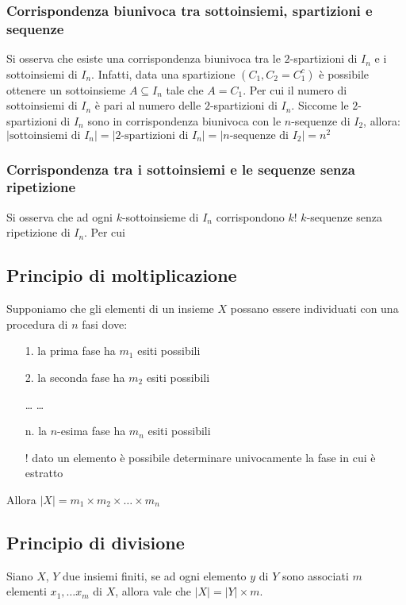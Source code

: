 \documentclass[a4paper]{article}
\begin{document}
\subsubsection*{Corrispondenza biunivoca tra sottoinsiemi, spartizioni e sequenze}
Si osserva che esiste una corrispondenza biunivoca tra le \(2\)-spartizioni di \(I_n\) e i sottoinsiemi di \(I_n\). Infatti, data
una spartizione \((C_1,C_2 = C_1^c)\) è possibile ottenere un sottoinsieme \(A \subseteq I_n\) tale che \(A = C_1\). Per cui il numero
di sottoinsiemi di \(I_n\) è pari al numero delle \(2\)-spartizioni di \(I_n\). Siccome le \(2\)-spartizioni di \(I_n\) sono in 
corrispondenza biunivoca con le \(n\)-sequenze di \(I_2\), allora: \\
\(|\text{sottoinsiemi di } I_n| = |2\text{-spartizioni di } I_n| = |n\text{-sequenze di } I_2| = n^2\)

\subsubsection*{Corrispondenza tra i sottoinsiemi e le sequenze senza ripetizione}
Si osserva che ad ogni \(k\)-sottoinsieme di \(I_n\) corrispondono \(k!\) \(k\)-sequenze senza ripetizione di \(I_n\). Per cui

\subsection{Principio di moltiplicazione}
Supponiamo che gli elementi di un insieme \(X\) possano essere individuati con una procedura di \(n\) fasi dove:
\begin{itemize}[topsep=3pt, itemsep=0pt]
	\item[1.] la prima fase ha \(m_1\) esiti possibili
	\item[2.] la seconda fase ha \(m_2\) esiti possibili
	\item[\dots] \dots
	\item[n.] la \(n\)-esima fase ha \(m_n\) esiti possibili
	\item[!] dato un elemento è possibile determinare univocamente la fase in cui è estratto
\end{itemize}
Allora \(|X| = m_1 \times m_2 \times \dots \times m_n\)

\subsection{Principio di divisione}
Siano \(X\), \(Y\) due insiemi finiti, se ad ogni elemento \(y\) di \(Y\) sono associati \(m\) elementi \(x_1, \dots x_m\) di \(X\),
allora vale che \(|X| = |Y| \times m\).
\end{document}
